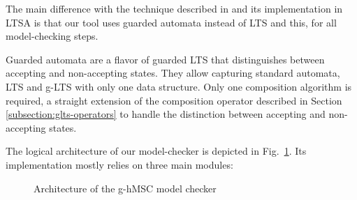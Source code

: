The main difference with the technique described in \cite{Giannakopoulou:2003} and its implementation in LTSA is that our tool uses guarded automata instead of LTS and this, for all model-checking steps. 

Guarded automata are a flavor of guarded LTS that distinguishes between accepting and non-accepting states. They allow capturing standard automata, LTS and g-LTS with only one data structure. Only one composition algorithm is required, a straight extension of the composition operator described in Section \ref{subsection:glts-operators} to handle the distinction between accepting and non-accepting states.

The logical architecture of our model-checker is depicted in Fig.~\ref{image:model-checker}. Its implementation mostly relies on three main modules:

\begin{figure}
\centering{}
  \caption{Architecture of the g-hMSC model checker\label{image:model-checker}}
\end{figure}

